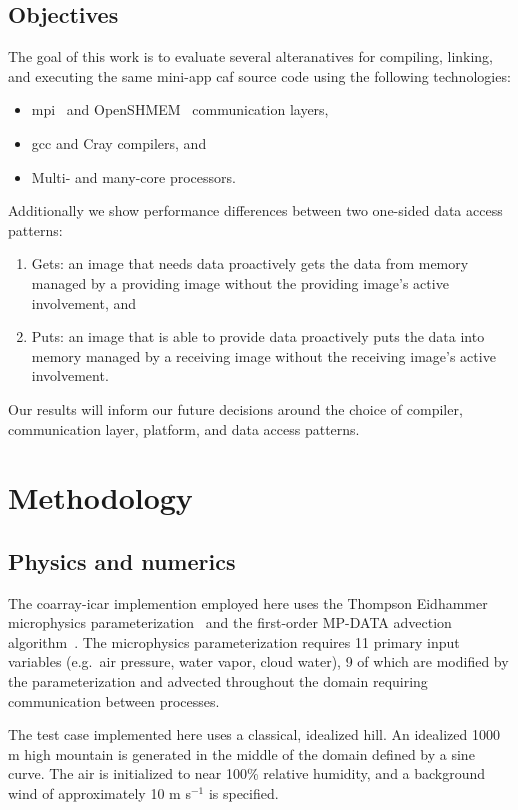 \subsection{Objectives}
The goal of this work is to evaluate several alteranatives for compiling, linking, and executing the
same \gls{mini-app} \gls{caf} source code using the following technologies:
\begin{itemize}
  \item \gls{mpi}~\cite{mpiforum2016mpi} and OpenSHMEM~\cite{chapman2010introducing} communication layers,
  \item \gls{gcc} and Cray compilers, and
  \item Multi- and many-core processors.
\end{itemize}
Additionally we show performance differences between two one-sided data access patterns:
\begin{enumerate}
  \item Gets: an image that needs data proactively gets the data from memory managed by a providing
        image without the providing image's active involvement, and
  \item Puts: an image that is able to provide data proactively puts the data into memory managed by
        a receiving image without the receiving image's active involvement.
\end{enumerate}
Our results will inform our future decisions around the choice of compiler, communication
layer, platform, and data access patterns.

\section{Methodology}
\subsection{Physics and numerics}
The coarray-\gls{icar} implemention employed here uses the Thompson Eidhammer microphysics parameterization~\cite{Thompson:2014cw} and the first-order MP-DATA advection algorithm~\cite{Smolarkiewicz:1998il}.
The microphysics parameterization requires 11 primary input variables (e.g.\ air pressure, water vapor, cloud water), 9 of which are modified by the parameterization and advected throughout the domain requiring communication between processes.

The test case implemented here uses a classical, idealized hill.
An idealized 1000 m high mountain is generated in the middle of the domain defined by a sine curve.
The air is initialized to near 100\% relative humidity, and a background wind of approximately 10 m s$^{-1}$ is specified.

